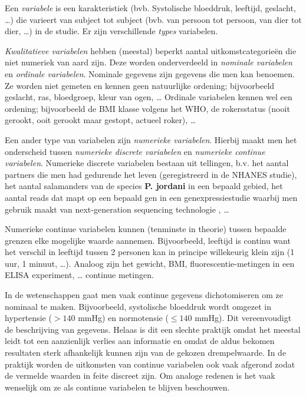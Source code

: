 \documentclass[
  dutch,
  letterpaper,
  12pt]{book}
\theoremstyle{definition}
\theoremstyle{definition}
\theoremstyle{definition}
\theoremstyle{remark}
\begin{document}
Een \emph{variabele} is een karakteristiek (bvb. Systolische bloeddruk,
leeftijd, geslacht, \ldots) die varieert van subject tot subject (bvb.
van persoon tot persoon, van dier tot dier, \ldots) in de studie. Er
zijn verschillende \emph{types} variabelen.

\emph{Kwalitatieve variabelen} hebben (meestal) beperkt aantal
uitkomstcategorieën die niet numeriek van aard zijn. Deze worden
onderverdeeld in \emph{nominale variabelen} en \emph{ordinale
variabelen}. Nominale gegevens zijn gegevens die men kan benoemen. Ze
worden niet gemeten en kennen geen natuurlijke ordening; bijvoorbeeld
geslacht, ras, bloedgroep, kleur van ogen, \ldots{} Ordinale variabelen
kennen wel een ordening; bijvoorbeeld de BMI klasse volgens het WHO, de
rokersstatus (nooit gerookt, ooit gerookt maar gestopt, actueel roker),
\ldots{}

Een ander type van variabelen zijn \emph{numerieke variabelen}. Hierbij
maakt men het onderscheid tussen \emph{numerieke discrete variabelen} en
\emph{numerieke continue variabelen}. Numerieke discrete variabelen
bestaan uit tellingen, b.v. het aantal partners die men had gedurende
het leven (geregistreerd in de NHANES studie), het aantal salamanders
van de species \textbf{P. jordani} in een bepaald gebied, het aantal
reads dat mapt op een bepaald gen in een genexpressiestudie waarbij men
gebruik maakt van next-generation sequencing technologie , \ldots{}

Numerieke continue variabelen kunnen (tenminste in theorie) tussen
bepaalde grenzen elke mogelijke waarde aannemen. Bijvoorbeeld, leeftijd
is continu want het verschil in leeftijd tussen 2 personen kan in
principe willekeurig klein zijn (1 uur, 1 minuut, \ldots). Analoog zijn
het gewicht, BMI, fluorescentie-metingen in een ELISA experiment,
\ldots{} continue metingen.

In de wetenschappen gaat men vaak continue gegevens dichotomiseren om ze
nominaal te maken. Bijvoorbeeld, systolische bloeddruk wordt omgezet in
hypertensie (\(>140\) mmHg) en normotensie (\(\leq 140\) mmHg). Dit
vereenvoudigt de beschrijving van gegevens. Helaas is dit een slechte
praktijk omdat het meestal leidt tot een aanzienlijk verlies aan
informatie en omdat de aldus bekomen resultaten sterk afhankelijk kunnen
zijn van de gekozen drempelwaarde. In de praktijk worden de uitkomsten
van continue variabelen ook vaak afgerond zodat de vermelde waarden in
feite discreet zijn. Om analoge redenen is het vaak wenselijk om ze als
continue variabelen te blijven beschouwen.
\end{document}
